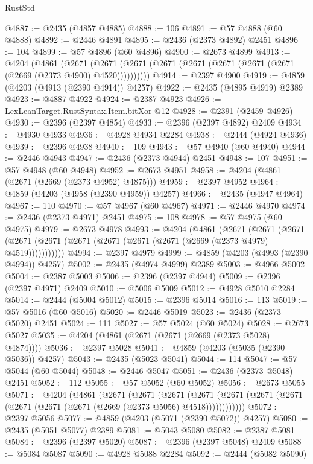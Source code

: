 \begin{lexlean}{RustStd}
\begin{coremodule}
@4887 := @2435 (@4857 @4885)
@4888 := 106
@4891 := @57 @4888 (@60 @4888)
@4892 := @2446 @4891
@4895 := @2436 (@2373 @4892) @2451
@4896 := 104
@4899 := @57 @4896 (@60 @4896)
@4900 := @2673 @4899
@4913 := @4204
    (@4861
      (@2671 (@2671 (@2671 (@2671 (@2671 (@2671 (@2671 (@2671 (@2669 (@2373 @4900) @4520))))))))))
@4914 := @2397 @4900
@4919 := @4859 (@4203 (@4913 (@2390 @4914)) @4257)
@4922 := @2435 (@4895 @4919) @2389
@4923 := @4887 @4922
@4924 := @2387 @4923
@4926 := LexLeanTarget.RustSyntax.Item.bitXor @12
@4928 := @2391 (@2459 @4926)
@4930 := @2396 (@2397 @4854)
@4933 := @2396 (@2397 @4892) @2409
@4934 := @4930 @4933
@4936 := @4928 @4934 @2284
@4938 := @2444 (@4924 @4936)
@4939 := @2396 @4938
@4940 := 109
@4943 := @57 @4940 (@60 @4940)
@4944 := @2446 @4943
@4947 := @2436 (@2373 @4944) @2451
@4948 := 107
@4951 := @57 @4948 (@60 @4948)
@4952 := @2673 @4951
@4958 := @4204 (@4861 (@2671 (@2669 (@2373 @4952) @4875)))
@4959 := @2397 @4952
@4964 := @4859 (@4203 (@4958 (@2390 @4959)) @4257)
@4966 := @2435 (@4947 @4964)
@4967 := 110
@4970 := @57 @4967 (@60 @4967)
@4971 := @2446 @4970
@4974 := @2436 (@2373 @4971) @2451
@4975 := 108
@4978 := @57 @4975 (@60 @4975)
@4979 := @2673 @4978
@4993 := @4204
    (@4861
      (@2671
        (@2671
          (@2671 (@2671 (@2671 (@2671 (@2671 (@2671 (@2671 (@2669 (@2373 @4979) @4519)))))))))))
@4994 := @2397 @4979
@4999 := @4859 (@4203 (@4993 (@2390 @4994)) @4257)
@5002 := @2435 (@4974 @4999) @2389
@5003 := @4966 @5002
@5004 := @2387 @5003
@5006 := @2396 (@2397 @4944)
@5009 := @2396 (@2397 @4971) @2409
@5010 := @5006 @5009
@5012 := @4928 @5010 @2284
@5014 := @2444 (@5004 @5012)
@5015 := @2396 @5014
@5016 := 113
@5019 := @57 @5016 (@60 @5016)
@5020 := @2446 @5019
@5023 := @2436 (@2373 @5020) @2451
@5024 := 111
@5027 := @57 @5024 (@60 @5024)
@5028 := @2673 @5027
@5035 := @4204 (@4861 (@2671 (@2671 (@2669 (@2373 @5028) @4874))))
@5036 := @2397 @5028
@5041 := @4859 (@4203 (@5035 (@2390 @5036)) @4257)
@5043 := @2435 (@5023 @5041)
@5044 := 114
@5047 := @57 @5044 (@60 @5044)
@5048 := @2446 @5047
@5051 := @2436 (@2373 @5048) @2451
@5052 := 112
@5055 := @57 @5052 (@60 @5052)
@5056 := @2673 @5055
@5071 := @4204
    (@4861
      (@2671
        (@2671
          (@2671
            (@2671 (@2671 (@2671 (@2671 (@2671 (@2671 (@2671 (@2669 (@2373 @5056) @4518))))))))))))
@5072 := @2397 @5056
@5077 := @4859 (@4203 (@5071 (@2390 @5072)) @4257)
@5080 := @2435 (@5051 @5077) @2389
@5081 := @5043 @5080
@5082 := @2387 @5081
@5084 := @2396 (@2397 @5020)
@5087 := @2396 (@2397 @5048) @2409
@5088 := @5084 @5087
@5090 := @4928 @5088 @2284
@5092 := @2444 (@5082 @5090)

\end{coremodule}
\end{lexlean}

